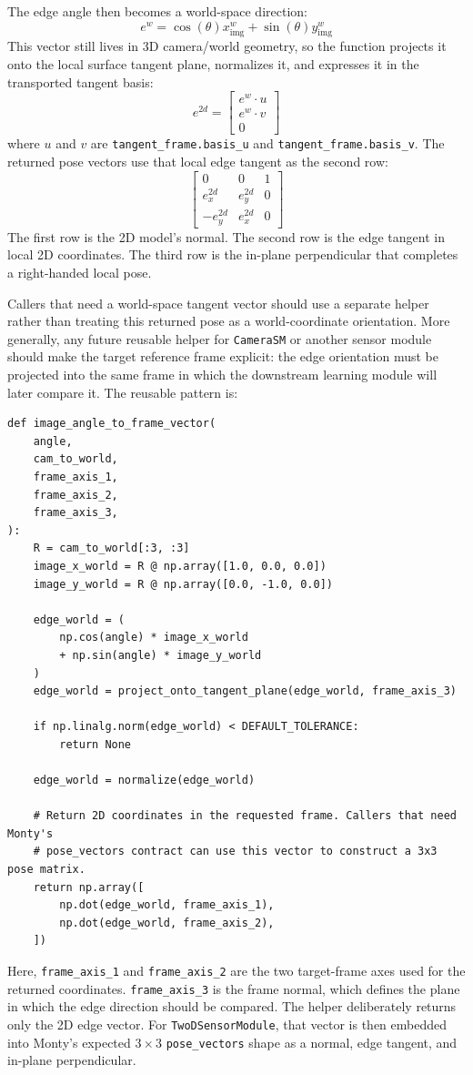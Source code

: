 \documentclass{article}
\begin{document}
The edge angle then becomes a world-space direction:
\[
  e^w =
    \cos(\theta) x_{\mathrm{img}}^{w}
    + \sin(\theta) y_{\mathrm{img}}^{w}
\]
This vector still lives in 3D camera/world geometry, so the function projects it onto the local surface tangent plane, normalizes it, and expresses it in the transported tangent basis:
\[
  e^{2d} =
  \begin{bmatrix}
    e^w \cdot u \\
    e^w \cdot v \\
    0
  \end{bmatrix}
\]
where $u$ and $v$ are \texttt{tangent\_frame.basis\_u} and \texttt{tangent\_frame.basis\_v}.
The returned pose vectors use that local edge tangent as the second row:
\[
  \begin{bmatrix}
    0 & 0 & 1 \\
    e_x^{2d} & e_y^{2d} & 0 \\
    -e_y^{2d} & e_x^{2d} & 0
  \end{bmatrix}
\]
The first row is the 2D model's normal.
The second row is the edge tangent in local 2D coordinates.
The third row is the in-plane perpendicular that completes a right-handed local pose.

Callers that need a world-space tangent vector should use a separate helper rather than treating this returned pose as a world-coordinate orientation.
More generally, any future reusable helper for \texttt{CameraSM} or another sensor module should make the target reference frame explicit: the edge orientation must be projected into the same frame in which the downstream learning module will later compare it.
The reusable pattern is:

\begin{verbatim}
def image_angle_to_frame_vector(
    angle,
    cam_to_world,
    frame_axis_1,
    frame_axis_2,
    frame_axis_3,
):
    R = cam_to_world[:3, :3]
    image_x_world = R @ np.array([1.0, 0.0, 0.0])
    image_y_world = R @ np.array([0.0, -1.0, 0.0])

    edge_world = (
        np.cos(angle) * image_x_world
        + np.sin(angle) * image_y_world
    )
    edge_world = project_onto_tangent_plane(edge_world, frame_axis_3)

    if np.linalg.norm(edge_world) < DEFAULT_TOLERANCE:
        return None

    edge_world = normalize(edge_world)

    # Return 2D coordinates in the requested frame. Callers that need Monty's
    # pose_vectors contract can use this vector to construct a 3x3 pose matrix.
    return np.array([
        np.dot(edge_world, frame_axis_1),
        np.dot(edge_world, frame_axis_2),
    ])
\end{verbatim}
Here, \texttt{frame\_axis\_1} and \texttt{frame\_axis\_2} are the two target-frame axes used for the returned coordinates.
\texttt{frame\_axis\_3} is the frame normal, which defines the plane in which the edge direction should be compared.
The helper deliberately returns only the 2D edge vector.
For \texttt{TwoDSensorModule}, that vector is then embedded into Monty's expected \(3 \times 3\) \texttt{pose\_vectors} shape as a normal, edge tangent, and in-plane perpendicular.
\end{document}
